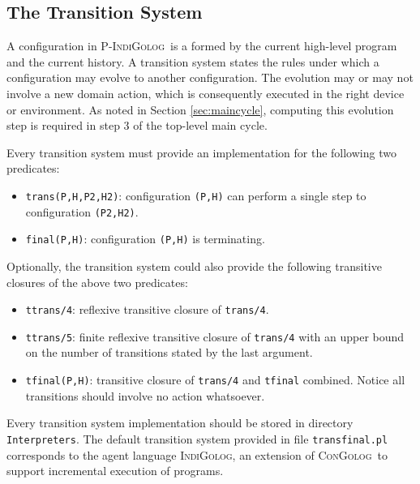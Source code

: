 \documentclass[11pt]{article}
\newcommand{\PIndiGolog}{\mbox{\textsc{P-IndiGolog}}}
\newcommand{\IndiGolog}{\mbox{\textsc{IndiGolog}}}
\newcommand{\ConGolog}{\mbox{\textsc{ConGolog}}}
\begin{document}
\subsection{The Transition System}

A configuration in \PIndiGolog\ is a formed by the current high-level program
and
the current history. A transition system states the rules under which a
configuration may evolve to another configuration. The evolution may or may
not involve a new domain action, which is consequently executed in the right
device or environment. As noted in Section \ref{sec:maincycle}, computing
this evolution step is required in step 3 of the top-level main cycle.

Every transition system must provide an implementation for the following two
predicates:

\begin{itemize}
\item  \texttt{trans(P,H,P2,H2)}: configuration \texttt{(P,H)} can perform a
single step to configuration \texttt{(P2,H2)}.

\item \texttt{final(P,H)}: configuration \texttt{(P,H)} is terminating.
\end{itemize}

Optionally, the transition system could also provide the following transitive
closures of the above two predicates:

\begin{itemize}
\item  \texttt{ttrans/4}: reflexive transitive closure of \texttt{trans/4}.

\item  \texttt{ttrans/5}: finite reflexive transitive closure of
\texttt{trans/4} with an upper bound on the number of transitions stated by the
last argument.

\item \texttt{tfinal(P,H)}: transitive closure of \texttt{trans/4} and
\texttt{tfinal} combined. Notice all transitions should involve no action
whatsoever.
\end{itemize}

Every transition system implementation should be stored in directory
\texttt{Interpreters}. The default transition system provided in file
\texttt{transfinal.pl} corresponds to the agent language \IndiGolog, an
extension of \ConGolog\ to support incremental execution of programs.


\end{document}

